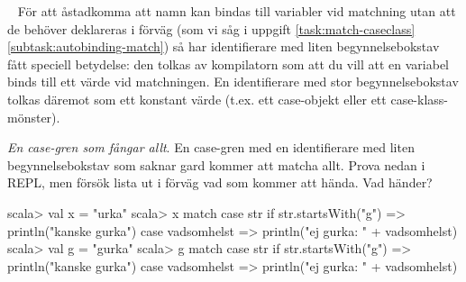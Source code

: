 \QUESTEND















\QUESTBEGIN

\Task  \what~  För att åstadkomma att namn kan bindas till variabler vid matchning utan att de behöver deklareras i förväg (som vi såg i uppgift \ref{task:match-caseclass}\ref{subtask:autobinding-match}) så har identifierare med liten begynnelsebokstav fått speciell betydelse: den tolkas av kompilatorn som att du vill att en variabel  binds till ett värde vid matchningen. En identifierare med stor begynnelsebokstav tolkas däremot som ett konstant värde (t.ex. ett case-objekt eller ett case-klass-mönster).

\Subtask \emph{En case-gren som fångar allt}. En case-gren med en identifierare med liten begynnelsebokstav som saknar gard kommer att matcha allt. Prova nedan i REPL, men försök lista ut i förväg vad som kommer att hända. Vad händer?
\begin{REPL}
scala> val x = "urka"
scala> x match
         case str if str.startsWith("g") => println("kanske gurka")
         case vadsomhelst => println("ej gurka: " + vadsomhelst)
scala> val g = "gurka"
scala> g match
         case str if str.startsWith("g") => println("kanske gurka")
         case vadsomhelst => println("ej gurka: " + vadsomhelst)
\end{REPL}

